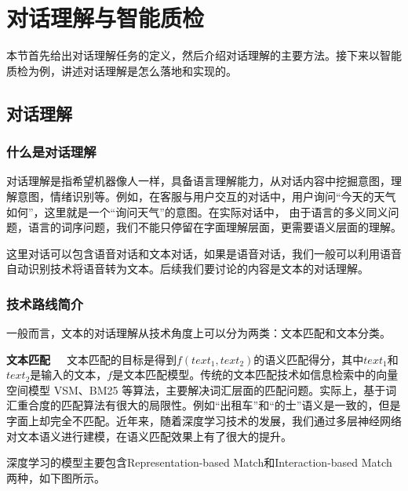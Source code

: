 %
%
%
\chapter{对话理解与智能质检}
\label{basic} %
本节首先给出对话理解任务的定义，然后介绍对话理解的主要方法。接下来以智能质检为例，讲述对话理解是怎么落地和实现的。
\section{对话理解}
\subsection{什么是对话理解}
对话理解是指希望机器像人一样，具备语言理解能力，从对话内容中挖掘意图，理解意图，情绪识别等。例如，在客服与用户交互的对话中，用户询问“今天的天气如何”，这里就是一个“询问天气”的意图。在实际对话中，
由于语言的多义同义问题，语言的词序问题，我们不能只停留在字面理解层面，更需要语义层面的理解。

这里对话可以包含语音对话和文本对话，如果是语音对话，我们一般可以利用语音自动识别技术将语音转为文本。后续我们要讨论的内容是文本的对话理解。
\subsection{技术路线简介}
一般而言，文本的对话理解从技术角度上可以分为两类：文本匹配和文本分类。

\textbf{文本匹配}~~~文本匹配的目标是得到$f(text_1, text_2)$的语义匹配得分，其中$text_1$和$text_2$是输入的文本，$f$是文本匹配模型。传统的文本匹配技术如信息检索中的向量空间模型 VSM、BM25 等算法，主要解决词汇层面的匹配问题。实际上，基于词汇重合度的匹配算法有很大的局限性。例如“出租车”和“的士”语义是一致的，但是字面上却完全不匹配。近年来，随着深度学习技术的发展，我们通过多层神经网络对文本语义进行建模，在语义匹配效果上有了很大的提升。

深度学习的模型主要包含Representation-based Match和Interaction-based Match两种，如下图所示。

